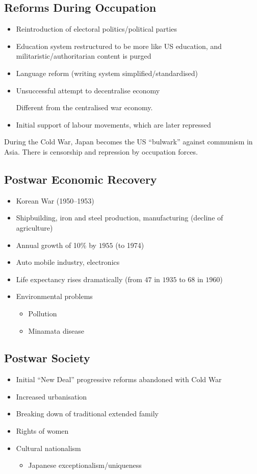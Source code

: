 \documentclass[class=article, crop=false]{standalone}
\begin{document}
  \subsection{Reforms During Occupation}
  \begin{itemize}
    \item Reintroduction of electoral politics/political parties
    \item Education system restructured to be more like US education, and militaristic/authoritarian content is purged
    \item Language reform (writing system simplified/standardised)
    \item Unsuccessful attempt to decentralise economy
    \begin{note}{}
      Different from the centralised war economy.
    \end{note}
    \item Initial support of labour movements, which are later repressed
  \end{itemize}
  During the Cold War, Japan becomes the US ``bulwark'' against communism in Asia. There is censorship and repression by occupation forces.
  \subsection{Postwar Economic Recovery}
  \begin{itemize}
    \item Korean War (1950--1953)
    \item Shipbuilding, iron and steel production, manufacturing (decline of agriculture)
    \item Annual growth of 10\% by $1955$ (to 1974)
    \item Auto mobile industry, electronics
    \item Life expectancy rises dramatically (from $47$ in $1935$ to $68$ in $1960$)
    \item Environmental problems
    \begin{itemize}
      \item Pollution
      \item Minamata disease
    \end{itemize}
  \end{itemize}
  \subsection{Postwar Society}
  \begin{itemize}
    \item Initial ``New Deal'' progressive reforms abandoned with Cold War
    \item Increased urbanisation
    \item Breaking down of traditional extended family
    \item Rights of women
    \item Cultural nationalism
    \begin{itemize}
      \item Japanese exceptionalism/uniqueness
    \end{itemize}
  \end{itemize}
\end{document}
